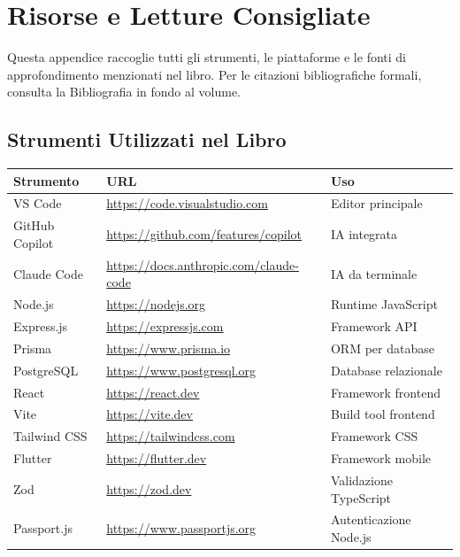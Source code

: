 \chapter{Risorse e Letture Consigliate}

Questa appendice raccoglie tutti gli strumenti, le piattaforme e le fonti di approfondimento menzionati nel libro. Per le citazioni bibliografiche formali, consulta la Bibliografia in fondo al volume.

\section{Strumenti Utilizzati nel Libro}

\begin{center}
\begin{small}
\begin{tabularx}{\textwidth}{l X l}
\toprule
\textbf{Strumento} & \textbf{URL} & \textbf{Uso} \\
\midrule
VS Code & \url{https://code.visualstudio.com} & Editor principale \\
GitHub Copilot & \url{https://github.com/features/copilot} & IA integrata \\
Claude Code & \url{https://docs.anthropic.com/claude-code} & IA da terminale \\
Node.js & \url{https://nodejs.org} & Runtime JavaScript \\
Express.js & \url{https://expressjs.com} & Framework API \\
Prisma & \url{https://www.prisma.io} & ORM per database \\
PostgreSQL & \url{https://www.postgresql.org} & Database relazionale \\
React & \url{https://react.dev} & Framework frontend \\
Vite & \url{https://vite.dev} & Build tool frontend \\
Tailwind CSS & \url{https://tailwindcss.com} & Framework CSS \\
Flutter & \url{https://flutter.dev} & Framework mobile \\
Zod & \url{https://zod.dev} & Validazione TypeScript \\
Passport.js & \url{https://www.passportjs.org} & Autenticazione Node.js \\
\bottomrule
\end{tabularx}
\end{small}
\end{center}


